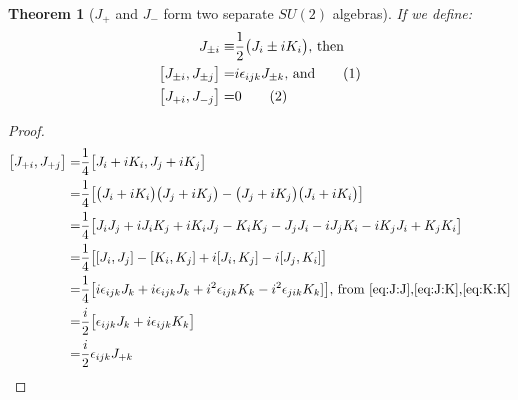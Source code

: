 \documentclass[]{article}
\newcommand\numberthis{\addtocounter{equation}{1}\tag{\theequation}}
\newtheorem{thm}{Theorem}
\begin{document}
\begin{thm}[$J_{+}$ and $J_{-}$ form two separate $SU(2)$ algebras]
	If we define:
	\begin{align*}
		J_{\pm i} \equiv & \frac{1}{2}\big(J_i\pm i K_i\big)\text{, then}\\
		\big[J_{\pm i},J_{\pm j}\big] =& i \epsilon_{ijk} J_{\pm k} \text{, and} \numberthis \label{eq:J:pm}\\
		\big[J_{+i},J_{-j}\big] =& 0 \numberthis \label{eq:J:pm1}
	\end{align*}
\end{thm}
\begin{proof}
	\begin{align*}
		\big[J_{+ i},	J_{+ j}\big]  = & \frac{1}{4}\big[J_i+ i K_i,J_j+ i K_j\big]\\
		 = & \frac{1}{4} \big[\big(J_i+ i K_i\big)\big(J_j+ i K_j\big)-\big(J_j+ i K_j\big)\big(J_i+ i K_i\big)\big]\\
		 = & \frac{1}{4} \big[J_iJ_j + i J_iK_j + iK_iJ_j - K_iK_j - J_jJ_i - i J_j K_i -i K_j J_i +K_jK_i\big]\\
		 = & \frac{1}{4} \big[[J_i,J_j] - [K_i,K_j] + i[J_i,K_j]-i[J_j,K_i] \big] \\
		 = & \frac{1}{4} \big[i\epsilon_{ijk}J_k +i\epsilon_{ijk}J_k + i^2\epsilon_{ijk}K_k-i^2\epsilon_{jik}K_k] \big]\text{, from \eqref{eq:J:J},\eqref{eq:J:K},\eqref{eq:K:K}}\\
		 =& \frac{i}{2} \big[\epsilon_{ijk}J_k+i \epsilon_{ijk}K_k\big]\\
		 =& \frac{i}{2} \epsilon_{ijk}J_{+ k}
	\end{align*}
	

\end{proof}
\end{document}

